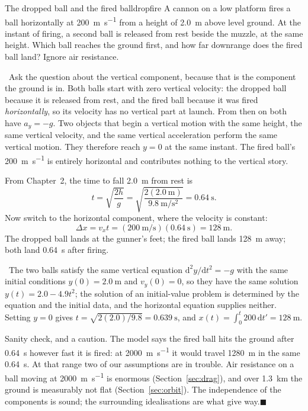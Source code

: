 \documentclass[11pt,twoside,openany]{book}
\newcommand{\dd}{\mathrm{d}}
\newcounter{check}[chapter]
\newcommand{\viewtag}[3]{\fcolorbox{#2}{#3}{\footnotesize\textbf{\textcolor{#2}{#1}}}}
\newcommand{\elemtag}{\viewtag{Elementary}{elemcol}{elempale}}
\newcommand{\calctag}{\viewtag{Calculus}{calccol}{calcpale}}
\newcommand{\elem}{\par\medskip\noindent\elemtag\ }
\newcommand{\calc}{\par\medskip\noindent\calctag\ }
\newcommand{\qed}{\hfill$\blacksquare$}
\begin{document}
\begin{example}{The dropped ball and the fired ball}{dropfire}
A cannon on a low platform fires a ball horizontally at \SI{200}{\metre\per\second} from a height of \SI{2.0}{\metre} above level ground. At the instant of firing, a second ball is released from rest beside the muzzle, at the same height. Which ball reaches the ground first, and how far downrange does the fired ball land? Ignore air resistance.

\elem Ask the question about the vertical component, because that is the component the ground is in. Both balls start with zero vertical velocity: the dropped ball because it is released from rest, and the fired ball because it was fired \emph{horizontally}, so its velocity has no vertical part at launch. From then on both have $a_y = -g$. Two objects that begin a vertical motion with the same height, the same vertical velocity, and the same vertical acceleration perform the same vertical motion. They therefore reach $y = 0$ at the same instant. The fired ball's \SI{200}{\metre\per\second} is entirely horizontal and contributes nothing to the vertical story.

From Chapter~2, the time to fall \SI{2.0}{\metre} from rest is
\[
t = \sqrt{\frac{2h}{g}} = \sqrt{\frac{2(\SI{2.0}{\metre})}{\SI{9.8}{\metre\per\second\squared}}} = \SI{0.64}{\second}.
\]
Now switch to the horizontal component, where the velocity is constant:
\[
\Delta x = v_x t = (\SI{200}{\metre\per\second})(\SI{0.64}{\second}) = \SI{128}{\metre}.
\]
The dropped ball lands at the gunner's feet; the fired ball lands \SI{128}{\metre} away; both land \SI{0.64}{\second} after firing.

\calc The two balls satisfy the same vertical equation $\dd^2 y/\dd t^2 = -g$ with the same initial conditions $y(0) = \SI{2.0}{\metre}$ and $v_y(0) = 0$, so they have the same solution $y(t) = 2.0 - 4.9t^2$; the solution of an initial-value problem is determined by the equation and the initial data, and the horizontal equation supplies neither. Setting $y = 0$ gives $t = \sqrt{2(2.0)/9.8} = \SI{0.639}{\second}$, and $x(t) = \int_0^{t} 200\,\dd t' = \SI{128}{\metre}$.

Sanity check, and a caution. The model says the fired ball hits the ground after \SI{0.64}{\second} however fast it is fired: at \SI{2000}{\metre\per\second} it would travel \SI{1280}{\metre} in the same \SI{0.64}{\second}. At that range two of our assumptions are in trouble. Air resistance on a ball moving at \SI{2000}{\metre\per\second} is enormous (Section~\ref{sec:drag}), and over \SI{1.3}{\kilo\metre} the ground is measurably not flat (Section~\ref{sec:orbit}). The independence of the components is sound; the surrounding idealisations are what give way.\qed
\end{example}
\end{document}
